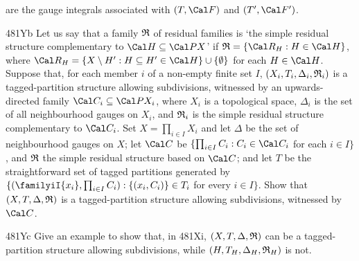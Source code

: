 {\noindent are the gauge integrals associated with $(T,\Cal F)$ and
$(T',\Cal F')$.

\spheader 481Yb Let us say that a family $\frak R$ of residual families
is `the simple residual structure complementary to
$\Cal H\subseteq\Cal PX$' if
$\frak R=\{\Cal R_H:H\in\Cal H\}$, where
$\Cal R_H=\{X\setminus H':H\subseteq H'\in\Cal H\}\cup\{\emptyset\}$ for
each $H\in\Cal H$.   Suppose that, for each member $i$ of a non-empty
finite set $I$, $(X_i,T_i,\Delta_i,\frak R_i)$ is a tagged-partition
structure allowing subdivisions, witnessed by an upwards-directed family
$\Cal C_i\subseteq\Cal PX_i$, where $X_i$ is a topological space,
$\Delta_i$ is the set of all neighbourhood gauges on $X_i$, and
$\frak R_i$ is the simple residual structure complementary to
$\Cal C_i$.
Set $X=\prod_{i\in I}X_i$ and let $\Delta$ be the set of neighbourhood
gauges on $X$;   let $\Cal C$ be
$\{\prod_{i\in I}C_i:C_i\in\Cal C_i$ for each $i\in I\}$, and $\frak R$
the simple residual structure based on $\Cal C$;  and let $T$ be the
straightforward set of tagged partitions generated by
$\{(\familyiI{x_i},\prod_{i\in I}C_i):\{(x_i,C_i)\}\in T_i$ for every
$i\in I\}$.
Show that $(X,T,\Delta,\frak R)$ is a tagged-partition structure
allowing subdivisions, witnessed by $\Cal C$.

\spheader 481Yc Give an example to show that, in 481Xi,
$(X,T,\Delta,\frak R)$ can be a tagged-partition structure allowing
subdivisions, while $(H,T_H,\Delta_H,\frak R_H)$ is not.
}%

